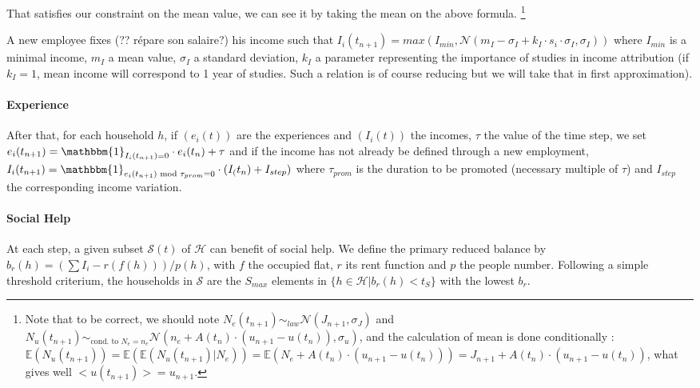 \documentclass[english]{article}
\begin{document}
That satisfies our constraint on the mean value, we can see it by taking
the mean on the above formula.%
\footnote{Note that to be correct, we should note $N_{e}(t_{n+1})\sim_{law}\mathcal{N}(J_{n+1},\sigma_{J})$
and $N_{u}(t_{n+1})\sim_{\textrm{cond. to }N_{e}=n_{e}}\mathcal{N}(n_{e}+A(t_{n})\cdot(u_{n+1}-u(t_{n})),\sigma_{u})$,
and the calculation of mean is done conditionally : $\mathbb{E}(N_{u}(t_{n+1}))=\mathbb{E}(\mathbb{E}(N_{u}(t_{n+1})|N_{e}))=\mathbb{E}(N_{e}+A(t_{n})\cdot(u_{n+1}-u(t_{n})))=J_{n+1}+A(t_{n})\cdot(u_{n+1}-u(t_{n}))$,
what gives well $<u(t_{n+1})>=u_{n+1}$. %
}

A new employee fixes (?? répare son salaire?) his income such that $I_{i}(t_{n+1})=max(I_{min},\mathcal{N}(m_{I}-\sigma_{I}+k_{I}\cdot s_{i}\cdot\sigma_{I},\sigma_{I}))$
where $I_{min}$ is a minimal income, $m_{I}$ a mean value, $\sigma_{I}$
a standard deviation, $k_{I}$ a parameter representing the importance
of studies in income attribution (if $k_{I}=1$, mean income will
correspond to 1 year of studies. Such a relation is of course reducing
but we will take that in first approximation).


\paragraph{Experience}

After that, for each household $h$, if $(e_{i}(t))$ are the experiences
and $(I_{i}(t))$ the incomes, $\tau$ the value of the time step,
we set $e_{i}(t_{n+1})= \mathbbm{1}_{I_{i}(t_{n+1})=0}\cdot e_{i}(t_{n})+ \tau$
and if the income has not already be defined through a new employment,
$I_{i}(t_{n+1}) = \mathbbm{1}_{e_{i}(t_{n+1}) \textrm{ mod } \tau_{prom} = 0}\cdot (I_(t_{n})+I_{step})$
where $\tau_{prom}$ is the duration to be promoted (necessary multiple
of $\tau$) and $I_{step}$ the corresponding income variation.


\paragraph{Social Help}

At each step, a given subset $\mathcal{S}(t)$ of $\mathcal{H}$ can
benefit of social help. We define the primary reduced balance by $b_{r}(h)=(\sum I_{i}-r(f(h)))/p(h)$,
with $f$ the occupied flat, $r$ its rent function and $p$ the people
number. Following a simple threshold criterium, the households in $\mathcal{S}$
are the $S_{max}$ elements in $\{h\in\mathcal{H}|b_{r}(h)<t_{S}\}$
with the lowest $b_{r}$.
\end{document}
